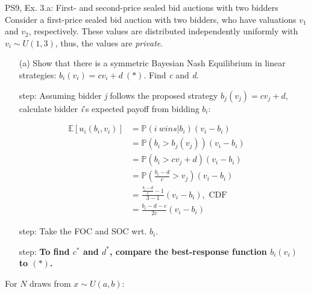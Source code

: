 \begin{frame}{PS9, Ex. 3.a: First- and second-price sealed bid auctions with two bidders}
    Consider a first-price sealed bid auction with two bidders, who have valuations $v_1$ and $v_2$, respectively. These values are distributed independently uniformly with $v_i\sim U(1,3)$, thus, the values are \textit{private}.
    \vspace{-4pt}
    \begin{itemize}
      \item[(a)] Show that there is a symmetric Bayesian Nash Equilibrium in linear strategies: $b_i(v_i) = cv_i + d\ (*)$. Find \textit{c} and \textit{d}.
    \end{itemize}
    \vspace{-8pt}
    \begin{multicols}{2}
      \begin{itemize}
        \item[\nth{1} step:] Assuming bidder \textit{j} follows the proposed strategy $b_j(v_j) = cv_j + d$, calculate bidder \textit{i}'s expected payoff from bidding $b_i$:
      \end{itemize}
      \vspace{-12pt}
      \begin{align*}
        \mathbb{E}[u_i(b_i,v_i)]&=\mathbb{P}(i\ wins|b_i)(v_i-b_i)\\
                                &=\mathbb{P}(b_i>b_j(v_j))(v_i-b_i)\\
                                &=\mathbb{P}(b_i>cv_j+d)(v_i-b_i)\\
                                &=\mathbb{P}\left(\frac{b_i-d}{c}>v_j\right)(v_i-b_i)\\
                                &=\frac{\frac{b_i-d}{c}-1}{3-1}(v_i-b_i),\text{ CDF}\\
                                &=\frac{b_i-d-c}{2c}(v_i-b_i)
      \end{align*}
      \vspace{-18pt}
      \begin{itemize}
        \item[\nth{2} step:] Take the FOC and SOC wrt. $b_i$.
        \item[\nth{3} step:] \textbf{To find $c^*$ and $d^*$, compare the best-response function $b_i(v_i)$ to $(*)$.}
      \end{itemize}
      \vfill\null\columnbreak
      For $N$ draws from $x\sim U(a, b):$
      \vspace{-6pt}
      \begin{enumerate}

\end{enumerate}
\end{multicols}
\end{frame}
